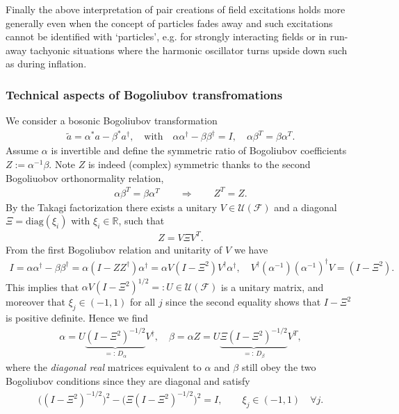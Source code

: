 \documentclass[../QFT_main.tex]{subfiles}
\begin{document}
\begin{mytheorem}
Finally the above interpretation of pair creations of field excitations holds more generally even when the concept of particles fades away and such excitations cannot be identified with `particles', e.g. for strongly interacting fields or in run-away tachyonic situations where the harmonic oscillator turns upside down such as during inflation.
\end{mytheorem}


\subsubsection{Technical aspects of Bogoliubov transfromations}


\begin{mytheorem}
%
We consider a bosonic Bogoliubov transformation
\begin{align}
    \tilde{a} = \alpha^* a - \beta^* a^\dagger ,\quad  \text{with} \quad \alpha \alpha^\dagger - \beta \beta^\dagger = I , \quad \alpha \beta^T = \beta \alpha^T .
\end{align}
Assume $\alpha$ is invertible and define the symmetric ratio of Bogoliubov coefficients $Z := \alpha^{-1} \beta$.
Note $Z$ is indeed (complex) symmetric thanks to the second Bogoliuobov orthonormality relation,
\begin{align}
    \alpha \beta^T = \beta \alpha^T\qquad \Longrightarrow \qquad Z^T = Z.
\end{align}
By the Takagi factorization there exists a unitary $V\in\mathcal{U}(\mathcal{F})$ and a diagonal $\Xi=\text{diag}(\xi_i)$ with $\xi_i\in\mathbb{R}$, such that
\begin{align}
    Z = V \Xi V^T.
\end{align}
From the first Bogoliubov relation and unitarity of $V$ we have 
\begin{align}
    I= \alpha \alpha^\dagger - \beta \beta^\dagger= 
    \alpha (I - Z Z^\dagger) \alpha^\dagger = \alpha V(I - \Xi^2) V^\dagger \alpha^\dagger, \quad V^\dagger (\alpha^{-1})(\alpha^{-1})^\dagger V = (I - \Xi^2).
\end{align}
This implies that $\alpha V (I - \Xi^2)^{1/2}=: U \in\mathcal{U}(\mathcal{F})$ is a unitary matrix, and moreover that $\xi_j\in(-1,1)$ for all $j$ since the second equality shows that $I - \Xi^2$ is positive definite.
Hence we find
\begin{align}
    \alpha = U \underbrace{(I - \Xi^2)^{-1/2}}_{=:\,D_\alpha} V^\dagger, \quad \beta = \alpha Z = U \underbrace{\Xi (I - \Xi^2)^{-1/2}}_{=:\,D_\beta} V^T,
\end{align}
where the \emph{diagonal real} matrices equivalent to $\alpha$ and $\beta$ still obey the two Bogoliubov conditions since they are diagonal and satisfy 
\begin{align}
    \Big((I - \Xi^2)^{-1/2}\Big)^2 - \Big(\Xi(I - \Xi^2)^{-1/2}\Big)^2 = I,\qquad \xi_j\in(-1,1) \quad \forall j.
\end{align}


\end{mytheorem}
\end{document}
